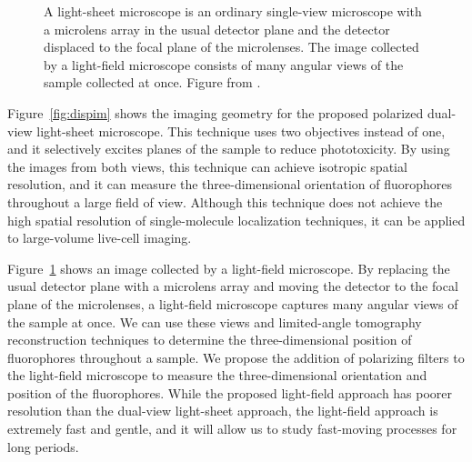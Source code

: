\documentclass[11pt]{article}
\begin{document}
\begin{figure}[t]
\begin{minipage}{.45\textwidth}
  \caption{A light-sheet microscope is an ordinary single-view microscope with a
    microlens array in the usual detector plane and the detector displaced to
    the focal plane of the microlenses. The image collected by a light-field
    microscope consists of many angular views of the sample collected at
    once. Figure from \cite{levoy2006}.}
  \label{fig:lf}
\end{minipage}
\end{figure}

Figure~\ref{fig:dispim} shows the imaging geometry for the proposed polarized dual-view
light-sheet microscope. This technique uses two objectives instead of one, and
it selectively excites planes of the sample to reduce phototoxicity. By using
the images from both views, this technique can achieve isotropic spatial
resolution, and it can measure the three-dimensional orientation of fluorophores
throughout a large field of view. Although this technique does not achieve the
high spatial resolution of single-molecule localization techniques, it can be
applied to large-volume live-cell imaging.

Figure~\ref{fig:lf} shows an image collected by a light-field microscope. By
replacing the usual detector plane with a microlens array and moving the
detector to the focal plane of the microlenses, a light-field microscope
captures many angular views of the sample at once. We can use these views and
limited-angle tomography reconstruction techniques to determine the
three-dimensional position of fluorophores throughout a sample. We propose the
addition of polarizing filters to the light-field microscope to measure the
three-dimensional orientation and position of the fluorophores. While the
proposed light-field approach has poorer resolution than the dual-view
light-sheet approach, the light-field approach is extremely fast and gentle, and
it will allow us to study fast-moving processes for long periods.
\end{document}
